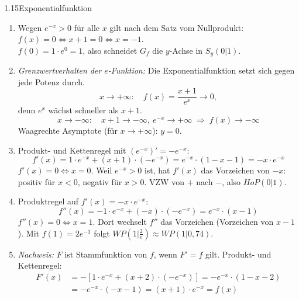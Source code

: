 \begin{loesung}{1.15}{Exponentialfunktion}
\begin{enumerate}[label=\alph*)]
  \item Wegen $e^{-x}>0$ für alle $x$ gilt nach dem Satz vom Nullprodukt: $f(x)=0\Longleftrightarrow x+1=0\Longleftrightarrow x=-1$.\\
  $f(0) = 1\cdot e^0 = 1$, also schneidet $G_f$ die $y$-Achse in $S_y(0|1)$.
  \item \textit{Grenzwertverhalten der $e$-Funktion:} Die Exponentialfunktion \glqq setzt sich gegen jede Potenz durch\grqq.
  \[x\longrightarrow+\infty:\quad f(x) = \dfrac{x+1}{e^x}\longrightarrow 0,\]
  denn $e^x$ wächst schneller als $x+1$.
  \[x\longrightarrow-\infty:\quad x+1\longrightarrow-\infty,\ e^{-x}\longrightarrow+\infty\;\Longrightarrow\; f(x)\longrightarrow-\infty\]
  Waagrechte Asymptote (für $x\longrightarrow+\infty$): $y=0$.
  \item Produkt- und Kettenregel mit $(e^{-x})' = -e^{-x}$:
  \[f'(x) = 1\cdot e^{-x}+(x+1)\cdot(-e^{-x}) = e^{-x}\cdot(1-x-1) = -x\cdot e^{-x}\]
  $f'(x)=0\Longleftrightarrow x=0$. Weil $e^{-x}>0$ ist, hat $f'(x)$ das Vorzeichen von $-x$: positiv für $x<0$, negativ für $x>0$. VZW von $+$ nach $-$, also $HoP(0|1)$.
  \item Produktregel auf $f'(x) = -x\cdot e^{-x}$:
  \[f''(x) = -1\cdot e^{-x}+(-x)\cdot(-e^{-x}) = e^{-x}\cdot(x-1)\]
  $f''(x)=0\Longleftrightarrow x=1$. Dort wechselt $f''$ das Vorzeichen (Vorzeichen von $x-1$). Mit $f(1) = 2e^{-1}$ folgt $WP\left(1\big|\frac{2}{e}\right)\approx WP(1|0{,}74)$.
  \item \textit{Nachweis:} $F$ ist Stammfunktion von $f$, wenn $F'=f$ gilt. Produkt- und Kettenregel:
  \begin{align*}
    F'(x) &= -\left[1\cdot e^{-x}+(x+2)\cdot(-e^{-x})\right] = -e^{-x}\cdot(1-x-2)\\
          &= -e^{-x}\cdot(-x-1) = (x+1)\cdot e^{-x} = f(x)
  \end{align*}
\end{enumerate}
\end{loesung}

